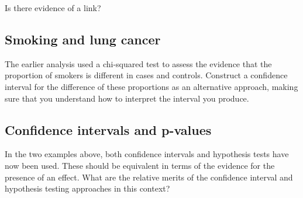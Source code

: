 \documentclass[
]{book}
\begin{document}
Is there evidence of a link?

\subsection{Smoking and lung cancer}\label{smoking-and-lung-cancer}

The earlier analysis used a chi-squared test to assess the evidence that the proportion of smokers is different in cases and controls. Construct a confidence interval for the difference of these proportions as an alternative approach, making sure that you understand how to interpret the interval you produce.

\subsection{Confidence intervals and p-values}\label{confidence-intervals-and-p-values}

In the two examples above, both confidence intervals and hypothesis tests have now been used. These should be equivalent in terms of the evidence for the presence of an effect. What are the relative merits of the confidence interval and hypothesis testing approaches in this context?
\end{document}
